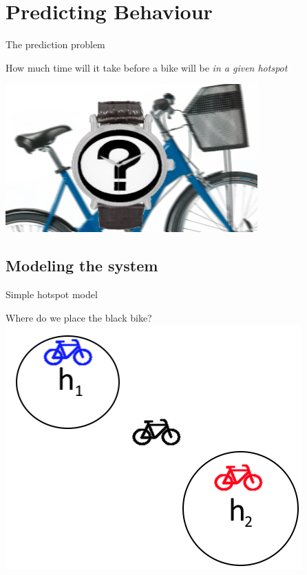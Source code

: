 \section{Predicting Behaviour}
\begin{frame}{The prediction problem}
\begin{center}
How much time will it take before a bike will be \emph{in a given hotspot}

\includegraphics[width=0.8\linewidth]{graphics/biketime}
\end{center}

\end{frame}

\subsection{Modeling the system}

\begin{frame}{Simple hotspot model}

\end{frame}

\begin{frame}
\begin{center}
Where do we place the black bike?	
\includegraphics[scale=0.7]{graphics/world}
\end{center}
\end{frame}

